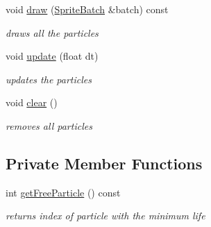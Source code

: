 \begin{DoxyCompactItemize}
void \hyperlink{classnta_1_1ParticleBatch2D_a270e573b2a767bf32fde34d17d838e69}{draw} (\hyperlink{classnta_1_1SpriteBatch}{Sprite\+Batch} \&batch) const
\begin{DoxyCompactList}\small\item\em draws all the particles \end{DoxyCompactList}\item 
\mbox{\label{classnta_1_1ParticleBatch2D_a55d3f2b663039bb95e847f0770c864cf}} 
void \hyperlink{classnta_1_1ParticleBatch2D_a55d3f2b663039bb95e847f0770c864cf}{update} (float dt)
\begin{DoxyCompactList}\small\item\em updates the particles \end{DoxyCompactList}\item 
\mbox{\label{classnta_1_1ParticleBatch2D_a1046b22d239222435e74011b3683a5c6}} 
void \hyperlink{classnta_1_1ParticleBatch2D_a1046b22d239222435e74011b3683a5c6}{clear} ()
\begin{DoxyCompactList}\small\item\em removes all particles \end{DoxyCompactList}\end{DoxyCompactItemize}
\subsection*{Private Member Functions}
\begin{DoxyCompactItemize}
\item 
\mbox{\label{classnta_1_1ParticleBatch2D_a123aac9af29133bfe358b9895de2b2ce}} 
int \hyperlink{classnta_1_1ParticleBatch2D_a123aac9af29133bfe358b9895de2b2ce}{get\+Free\+Particle} () const
\begin{DoxyCompactList}\small\item\em returns index of particle with the minimum life \end{DoxyCompactList}\end{DoxyCompactItemize}
